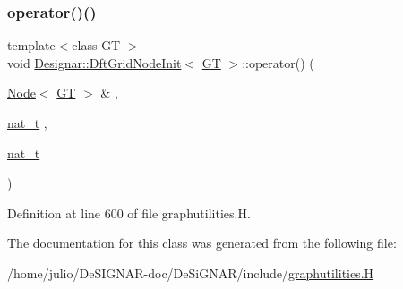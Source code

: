 \subsubsection{\texorpdfstring{operator()()}{operator()()}}
{\footnotesize\ttfamily template$<$class GT $>$ \\
void \hyperlink{class_designar_1_1_dft_grid_node_init}{Designar\+::\+Dft\+Grid\+Node\+Init}$<$ \hyperlink{demo-buildgraph_8_c_a3001c40d2c31ca87ed96cd7d1334a55e}{GT} $>$\+::operator() (\begin{DoxyParamCaption}\item[{\hyperlink{namespace_designar_a5af326c65aa2bd26b26c410f2030d09e}{Node}$<$ \hyperlink{demo-buildgraph_8_c_a3001c40d2c31ca87ed96cd7d1334a55e}{GT} $>$ \&}]{,  }\item[{\hyperlink{namespace_designar_aa72662848b9f4815e7bf31a7cf3e33d1}{nat\+\_\+t}}]{,  }\item[{\hyperlink{namespace_designar_aa72662848b9f4815e7bf31a7cf3e33d1}{nat\+\_\+t}}]{ }\end{DoxyParamCaption})\hspace{0.3cm}{\ttfamily [inline]}}



Definition at line 600 of file graphutilities.\+H.



The documentation for this class was generated from the following file\+:\begin{DoxyCompactItemize}
\item 
/home/julio/\+De\+S\+I\+G\+N\+A\+R-\/doc/\+De\+Si\+G\+N\+A\+R/include/\hyperlink{graphutilities_8_h}{graphutilities.\+H}\end{DoxyCompactItemize}
